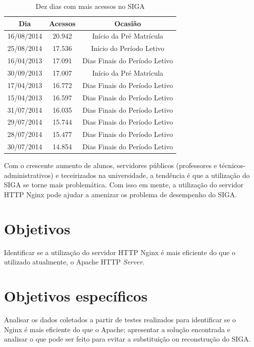 \begin{table}[htb]
	\centering
	\ABNTEXfontereduzida
	\caption{Dez dias com mais acessos no SIGA}
	\label{tab:top10acessos}
	\begin{tabular}{|c|c|c|}
		\hline
		\textbf{Dia} & \textbf{Acessos}  & \textbf{Ocasião} \\ \hline
		16/08/2014 & 20.942 & Início da Pré Matrícula \\ \hline
		25/08/2014 & 17.536 & Início do Período Letivo \\ \hline
		16/04/2013 & 17.091 & Dias Finais do Período Letivo \\ \hline
		30/09/2013 & 17.007 & Início da Pré Matrícula \\ \hline
		17/04/2013 & 16.772 & Dias Finais do Período Letivo \\ \hline
		15/04/2013 & 16.597 & Dias Finais do Período Letivo \\ \hline
		31/07/2014 & 16.035 & Dias Finais do Período Letivo \\ \hline
		29/07/2014 & 15.744 & Dias Finais do Período Letivo \\ \hline
		28/07/2014 & 15.477 & Dias Finais do Período Letivo \\ \hline
		30/07/2014 & 14.854 & Dias Finais do Período Letivo \\ \hline
	\end{tabular}
\end{table}
Com o crescente aumento de alunos, servidores públicos (professores e 
técnicos-administrativos) e teceirizados na universidade, a tendência é que a 
utilização do SIGA se torne mais problemática.
Com isso em mente, a utilização do servidor HTTP Nginx pode ajudar a amenizar 
os problema de desempenho do SIGA.\\
\section{Objetivos}
Identificar se a utilização do servidor HTTP Nginx é mais eficiente do que o 
utilizado atualmente, o Apache HTTP \textit{Server}.\\
\section{Objetivos específicos}
Analisar os dados coletados a partir de testes realizados para identificar se o 
Nginx é mais eficiente do que o Apache; apresentar a solução encontrada e 
analisar o que pode ser feito para evitar a substituição ou reconstrução do 
SIGA.\\
